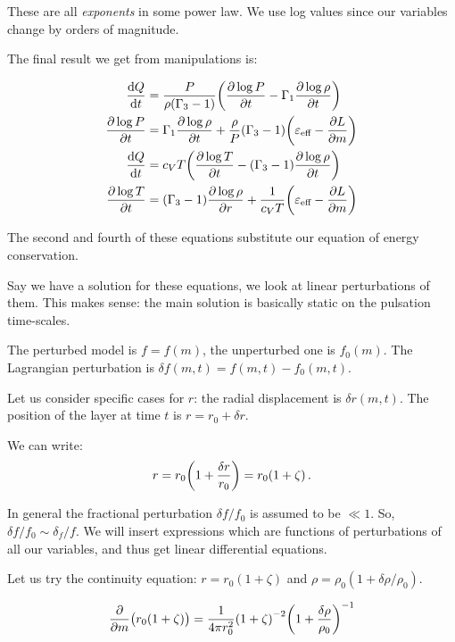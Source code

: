 \documentclass[main.tex]{subfiles}
\begin{document}
These are all \emph{exponents} in some power law.
We use log values since our variables change by orders of magnitude.

The final result we get from manipulations is:

\begin{subequations}
\begin{align}
  \dv{Q}{t}  &= \frac{P}{\rho (\Gamma_3 -1)} \qty(\pdv{\log P }{t} - \Gamma_1\pdv{\log \rho}{t}  )  \\
  \pdv{\log P }{t} &= \Gamma_1 \pdv{\log \rho}{t} + \frac{\rho}{P} (\Gamma_3 - 1) \qty(\varepsilon_{\text{eff}} - \pdv{L}{m})  \\
  \dv{Q}{t} &= c_V T \qty(\pdv{\log T}{t} - (\Gamma_3 - 1) \pdv{\log \rho}{t}) \\
  \pdv{\log T }{t} &= (\Gamma_3 - 1) \pdv{\log \rho}{r} + \frac{1}{c_V T} \qty(\varepsilon_{\text{eff}} - \pdv{L}{m})  
\end{align}
\end{subequations}

The second and fourth of these equations substitute our equation of energy conservation.

Say we have a solution for these equations, we look at linear perturbations of them.
This makes sense: the main solution is basically static on the pulsation time-scales.

The perturbed model is \(f = f(m)\),  the unperturbed one is \(f_0(m)\).
The Lagrangian perturbation is \(\delta f (m, t) = f(m, t) - f_0(m, t)\).

Let us consider specific cases for \(r\): the radial displacement is \(\delta r (m, t)\). The position of the layer at time \(t\) is \(r = r_0 + \delta r\).

We can write:
%
\begin{equation}
  r = r_0 \qty(1 + \frac{\delta r}{r_0} ) = r_0 (1+ \zeta)\,.
\end{equation}

In general the fractional perturbation \(\delta f / f_0\) is assumed to be \(\ll 1 \). So, \(\delta f / f_0 \sim \delta_f / f\).
We will insert expressions which are functions of perturbations of all our variables, and thus get linear differential equations.

Let us try the continuity equation: \(r = r_0 (1+\zeta)\) and \(\rho = \rho_0 (1 + \delta \rho / \rho_0)\).

\begin{equation}
  \pdv{}{m} \qty(r_0 (1+\zeta)) =
  \frac{1}{4 \pi r_0^2} \qty(1+\zeta)^{-2} \qty(1 + \frac{\delta \rho}{\rho_0})^{-1}
\end{equation}
\end{document}
